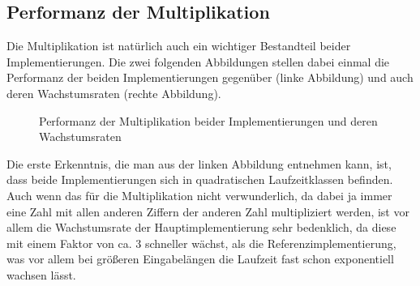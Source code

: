 \documentclass[course=erap]{aspdoc}
\begin{document}
    \subsection{Performanz der Multiplikation}

    Die Multiplikation ist natürlich auch ein wichtiger Bestandteil beider Implementierungen. Die zwei folgenden Abbildungen stellen dabei einmal
    die Performanz der beiden Implementierungen gegenüber (linke Abbildung) und auch deren Wachstumsraten (rechte Abbildung). \\

    \begin{figure}[ht]
        \captionsetup{justification=centering}
        \caption{Performanz der Multiplikation beider Implementierungen und deren Wachstumsraten}
    \end{figure}

    Die erste Erkenntnis, die man aus der linken Abbildung entnehmen kann, ist, dass beide Implementierungen
    sich in quadratischen Laufzeitklassen befinden. Auch wenn das für die Multiplikation nicht verwunderlich, da dabei ja immer eine Zahl
    mit allen anderen Ziffern der anderen Zahl multipliziert werden, ist vor allem die Wachstumsrate der Hauptimplementierung sehr bedenklich,
    da diese mit einem Faktor von ca. $3$ schneller wächst, als die Referenzimplementierung, was vor allem bei größeren Eingabelängen
    die Laufzeit fast schon exponentiell wachsen lässt.
\end{document}
